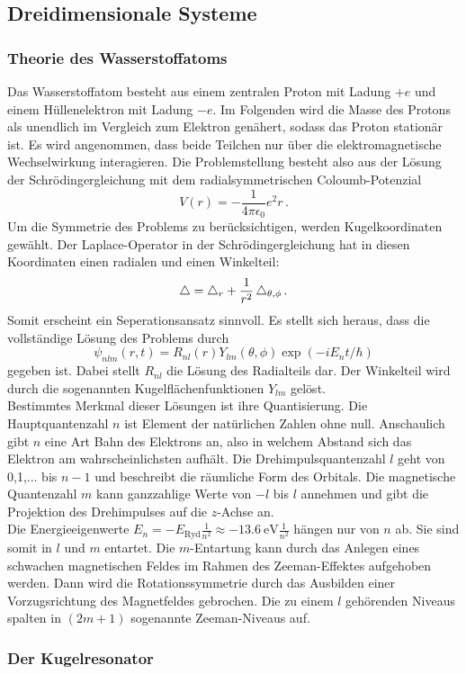 \subsection{Dreidimensionale Systeme}
\label{subsec:dreidimsyst}

\subsubsection{Theorie des Wasserstoffatoms}
\label{subsubsec:hatom}
Das Wasserstoffatom besteht aus einem zentralen Proton mit Ladung $+e$ und einem Hüllenelektron mit Ladung $-e$. Im Folgenden wird die Masse des Protons als unendlich im Vergleich zum Elektron genähert, sodass das Proton stationär ist. Es wird angenommen, dass beide Teilchen nur über die elektromagnetische Wechselwirkung interagieren. Die Problemstellung besteht also aus der Lösung der Schrödingergleichung mit dem radialsymmetrischen Coloumb-Potenzial
\begin{equation}
  V(r) = - \frac{1}{4 \pi \epsilon_0}{e^2}{r}\,.
  \label{eqn:coloumb}
\end{equation}
Um die Symmetrie des Problems zu berücksichtigen, werden Kugelkoordinaten gewählt. Der Laplace-Operator in der Schrödingergleichung hat in diesen Koordinaten einen radialen und einen Winkelteil:
\begin{equation}
  \mathop{}\!\mathbin\bigtriangleup = \mathop{}\!\mathbin\bigtriangleup_r + \frac{1}{r^2} \mathop{}\!\mathbin\bigtriangleup_{\theta, \phi}\,.
  \label{eqn:laplaceWinkel}
\end{equation}
Somit erscheint ein Seperationsansatz sinnvoll. Es stellt sich heraus, dass die vollständige Lösung des Problems durch
\begin{equation}
  \psi_{nlm}(r,t) = R_{nl}(r) Y_{lm}(\theta, \phi) \exp(-i E_n t / \hbar)
  \label{eqn:hatomloesung}
\end{equation}
gegeben ist. Dabei stellt $R_{nl}$ die Lösung des Radialteils dar. Der Winkelteil wird durch die sogenannten Kugelflächenfunktionen $Y_{lm}$ gelöst.\\
Bestimmtes Merkmal dieser Lösungen ist ihre Quantisierung. Die Hauptquantenzahl $n$ ist Element der natürlichen Zahlen ohne null. Anschaulich gibt $n$ eine Art Bahn des Elektrons an, also in welchem Abstand sich das Elektron am wahrscheinlichsten aufhält. Die Drehimpulsquantenzahl $l$ geht von 0,1,... bis $n-1$ und beschreibt die räumliche Form des Orbitals. Die magnetische Quantenzahl $m$ kann ganzzahlige Werte von $-l$ bis $l$ annehmen und gibt die Projektion des Drehimpulses auf die $z$-Achse an.\\
Die Energieeigenwerte $E_n = -E_{\text{Ryd}} \frac{1}{n^2} \approx -\SI{13.6}{\electronvolt} \frac{1}{n^2}$ hängen nur von $n$ ab. Sie sind somit in $l$ und $m$ entartet. Die $m$-Entartung kann durch das Anlegen eines schwachen magnetischen Feldes im Rahmen des Zeeman-Effektes aufgehoben werden. Dann wird die Rotationssymmetrie durch das Ausbilden einer Vorzugsrichtung des Magnetfeldes gebrochen. Die zu einem $l$ gehörenden Niveaus spalten in $(2m+1)$ sogenannte Zeeman-Niveaus auf.

\subsubsection{Der Kugelresonator}
\label{subsubsec:kugelresonator}
